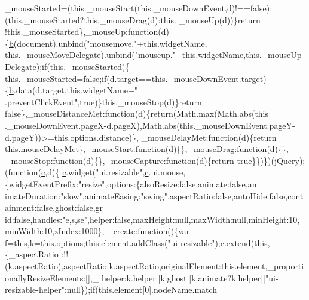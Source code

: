 \begin{DoxyCode}
      \_mouseStarted=(this.\_mouseStart(this.\_mouseDownEvent,d)!==\textcolor{keyword}{false});(this.\_mouseStarted?this.\_mouseDrag(d):this.
      \_mouseUp(d))\}\textcolor{keywordflow}{return} !this.\_mouseStarted\},\_mouseUp:\textcolor{keyword}{function}(d)\{\hyperlink{jquery_8js_aa4026ad5544b958e54ce5e106fa1c805}{b}(document).unbind(\textcolor{stringliteral}{"mousemove."}+this.widgetName,
      this.\_mouseMoveDelegate).unbind(\textcolor{stringliteral}{"mouseup."}+this.widgetName,this.\_mouseUpDelegate);\textcolor{keywordflow}{if}(this.\_mouseStarted)\{
      this.\_mouseStarted=\textcolor{keyword}{false};\textcolor{keywordflow}{if}(d.target==\textcolor{keyword}{this}.\_mouseDownEvent.target)\{\hyperlink{jquery_8js_aa4026ad5544b958e54ce5e106fa1c805}{b}.data(d.target,\textcolor{keyword}{this}.widgetName+\textcolor{stringliteral}{"
      .preventClickEvent"},\textcolor{keyword}{true})\}this.\_mouseStop(d)\}\textcolor{keywordflow}{return} \textcolor{keyword}{false}\},\_mouseDistanceMet:\textcolor{keyword}{function}(d)\{\textcolor{keywordflow}{return}(Math.max(Math.abs(\textcolor{keyword}{this}
      .\_mouseDownEvent.pageX-d.pageX),Math.abs(this.\_mouseDownEvent.pageY-d.pageY))>=this.options.distance)\},
      \_mouseDelayMet:\textcolor{keyword}{function}(d)\{\textcolor{keywordflow}{return} this.mouseDelayMet\},\_mouseStart:\textcolor{keyword}{function}(d)\{\},\_mouseDrag:\textcolor{keyword}{function}(d)\{\},
      \_mouseStop:\textcolor{keyword}{function}(d)\{\},\_mouseCapture:\textcolor{keyword}{function}(d)\{\textcolor{keywordflow}{return} \textcolor{keyword}{true}\}\})\})(jQuery);(\textcolor{keyword}{function}(\hyperlink{jquery_8js_ad171626e81625b5e9f5cb177a3a8fb1c}{c},d)\{
      \hyperlink{jquery_8js_ad171626e81625b5e9f5cb177a3a8fb1c}{c}.widget(\textcolor{stringliteral}{"ui.resizable"},\hyperlink{jquery_8js_ad171626e81625b5e9f5cb177a3a8fb1c}{c}.ui.mouse,\{widgetEventPrefix:\textcolor{stringliteral}{"resize"},options:\{alsoResize:false,animate:false,an
      imateDuration:\textcolor{stringliteral}{"slow"},animateEasing:\textcolor{stringliteral}{"swing"},aspectRatio:false,autoHide:false,containment:false,ghost:false,gr
      id:false,handles:\textcolor{stringliteral}{"e,s,se"},helper:false,maxHeight:null,maxWidth:null,minHeight:10,minWidth:10,zIndex:1000\},
      \_create:\textcolor{keyword}{function}()\{var f=this,k=this.options;this.element.addClass(\textcolor{stringliteral}{"ui-resizable"});c.extend(this,\{\_aspectRatio
      :!!(k.aspectRatio),aspectRatio:k.aspectRatio,originalElement:this.element,\_proportionallyResizeElements:[],\_
      helper:k.helper||k.ghost||k.animate?k.helper||\textcolor{stringliteral}{"ui-resizable-helper"}:null\});\textcolor{keywordflow}{if}(this.element[0].nodeName.match

\end{DoxyCode}
